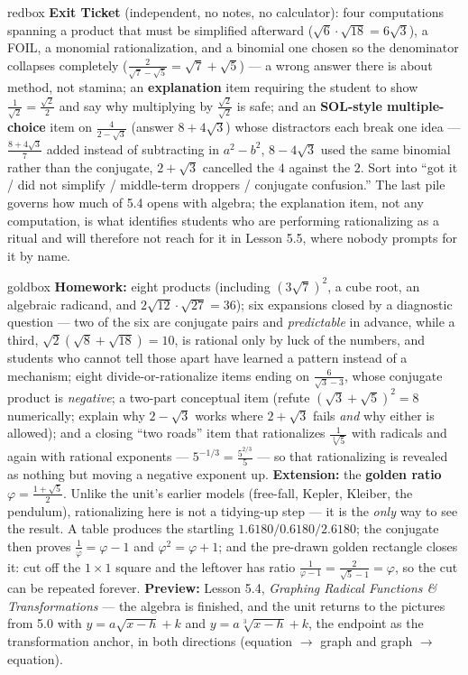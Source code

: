 \documentclass[10pt]{article}
\begin{document}
\begin{skillbox}{redbox}
\textbf{Exit Ticket} (independent, no notes, no calculator): four computations spanning a product
that must be simplified afterward ($\sqrt6\cdot\sqrt{18}=6\sqrt3$), a FOIL, a monomial
rationalization, and a binomial one chosen so the denominator collapses completely
($\frac{2}{\sqrt7-\sqrt5}=\sqrt7+\sqrt5$) --- a wrong answer there is about method, not stamina; an
\textbf{explanation} item requiring the student to show $\frac{1}{\sqrt2}=\frac{\sqrt2}{2}$ and say
why multiplying by $\frac{\sqrt2}{\sqrt2}$ is safe; and an \textbf{SOL-style multiple-choice} item
on $\frac{4}{2-\sqrt3}$ (answer $8+4\sqrt3$) whose distractors each break one idea ---
$\frac{8+4\sqrt3}{7}$ added instead of subtracting in $a^{2}-b^{2}$, $8-4\sqrt3$ used the same
binomial rather than the conjugate, $2+\sqrt3$ cancelled the $4$ against the $2$. Sort into
``got it / did not simplify / middle-term droppers / conjugate confusion.'' The last pile governs
how much of 5.4 opens with algebra; the explanation item, not any computation, is what identifies
students who are performing rationalizing as a ritual and will therefore not reach for it in Lesson
5.5, where nobody prompts for it by name.
\end{skillbox}

\begin{skillbox}{goldbox}
\textbf{Homework:} eight products (including $\left(3\sqrt7\right)^{2}$, a cube root, an algebraic
radicand, and $2\sqrt{12}\cdot\sqrt{27}=36$); six expansions closed by a diagnostic question ---
two of the six are conjugate pairs and \emph{predictable} in advance, while a third, $\sqrt2
\left(\sqrt8+\sqrt{18}\right)=10$, is rational only by luck of the numbers, and students who cannot
tell those apart have learned a pattern instead of a mechanism; eight divide-or-rationalize items
ending on $\frac{6}{\sqrt3-3}$, whose conjugate product is \emph{negative}; a two-part conceptual
item (refute $\left(\sqrt3+\sqrt5\right)^{2}=8$ numerically; explain why $2-\sqrt3$ works where
$2+\sqrt3$ fails \emph{and} why either is allowed); and a closing ``two roads'' item that
rationalizes $\frac{1}{\sqrt[3]5}$ with radicals and again with rational exponents ---
$5^{-1/3}=\frac{5^{2/3}}{5}$ --- so that rationalizing is revealed as nothing but moving a negative
exponent up. \textbf{Extension:} the \textbf{golden ratio} $\varphi=\frac{1+\sqrt5}{2}$. Unlike the
unit's earlier models (free-fall, Kepler, Kleiber, the pendulum), rationalizing here is not a
tidying-up step --- it is the \emph{only} way to see the result. A table produces the startling
$1.6180 / 0.6180 / 2.6180$; the conjugate then proves $\frac1\varphi=\varphi-1$ and
$\varphi^{2}=\varphi+1$; and the pre-drawn golden rectangle closes it: cut off the $1\times1$
square and the leftover has ratio $\frac{1}{\varphi-1}=\frac{2}{\sqrt5-1}=\varphi$, so the cut can
be repeated forever. \textbf{Preview:} Lesson 5.4, \emph{Graphing Radical Functions \&
Transformations} --- the algebra is finished, and the unit returns to the pictures from 5.0 with
$y=a\sqrt{x-h}+k$ and $y=a\sqrt[3]{x-h}+k$, the endpoint as the transformation anchor, in both
directions (equation $\to$ graph and graph $\to$ equation).
\end{skillbox}
\end{document}
